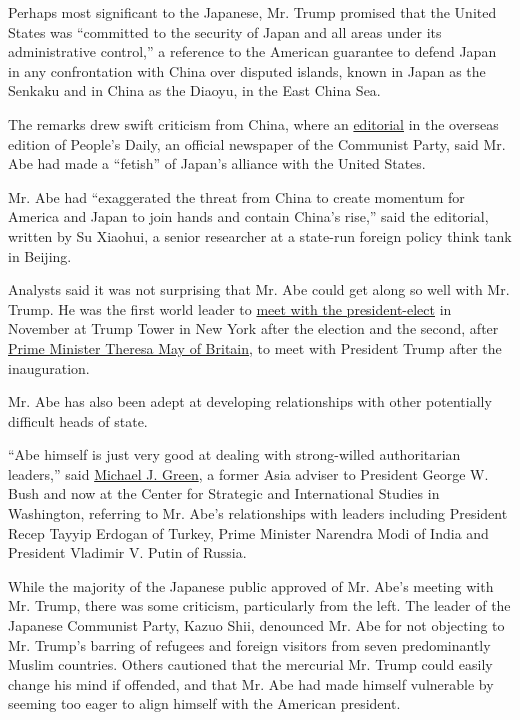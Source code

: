 Perhaps most significant to the Japanese, Mr. Trump promised that the
United States was ``committed to the security of Japan and all areas
under its administrative control,'' a reference to the American
guarantee to defend Japan in any confrontation with China over disputed
islands, known in Japan as the Senkaku and in China as the Diaoyu, in
the East China Sea.

The remarks drew swift criticism from China, where an
\href{http://paper.people.com.cn/rmrbhwb/html/2017-02/13/content_1749422.htm}{editorial}
in the overseas edition of People's Daily, an official newspaper of the
Communist Party, said Mr. Abe had made a ``fetish'' of Japan's alliance
with the United States.

Mr. Abe had ``exaggerated the threat from China to create momentum for
America and Japan to join hands and contain China's rise,'' said the
editorial, written by Su Xiaohui, a senior researcher at a state-run
foreign policy think tank in Beijing.

Analysts said it was not surprising that Mr. Abe could get along so well
with Mr. Trump. He was the first world leader to
\href{https://www.nytimes3xbfgragh.onion/2016/11/17/world/asia/shinzo-abe-donald-trump.html}{meet
with the president-elect} in November at Trump Tower in New York after
the election and the second, after
\href{https://www.nytimes3xbfgragh.onion/2017/01/27/world/europe/theresa-may-britain-trump.html}{Prime
Minister Theresa May of Britain}, to meet with President Trump after the
inauguration.

Mr. Abe has also been adept at developing relationships with other
potentially difficult heads of state.

``Abe himself is just very good at dealing with strong-willed
authoritarian leaders,'' said
\href{https://www.csis.org/people/michael-j-green}{Michael J. Green}, a
former Asia adviser to President George W. Bush and now at the Center
for Strategic and International Studies in Washington, referring to Mr.
Abe's relationships with leaders including President Recep Tayyip
Erdogan of Turkey, Prime Minister Narendra Modi of India and President
Vladimir V. Putin of Russia.

While the majority of the Japanese public approved of Mr. Abe's meeting
with Mr. Trump, there was some criticism, particularly from the left.
The leader of the Japanese Communist Party, Kazuo Shii, denounced Mr.
Abe for not objecting to Mr. Trump's barring of refugees and foreign
visitors from seven predominantly Muslim countries. Others cautioned
that the mercurial Mr. Trump could easily change his mind if offended,
and that Mr. Abe had made himself vulnerable by seeming too eager to
align himself with the American president.

